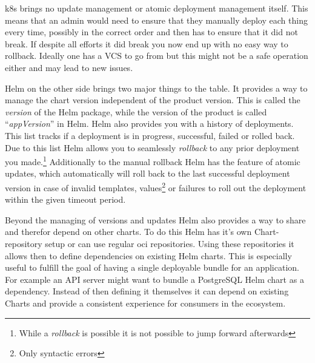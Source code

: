 \Gls{k8s} brings no update management or atomic deployment management itself.
This means that an admin would need to ensure that they manually deploy each thing every time, possibly in the correct order and then has to ensure that it did not break.
If despite all efforts it did break you now end up with no easy way to rollback.
Ideally one has a VCS to go from but this might not be a safe operation either and may lead to new issues.

Helm on the other side brings two major things to the table.
It provides a way to manage the chart version independent of the product version.
This is called the \emph{version} of the Helm package, while the version of the product is called \enquote{\emph{appVersion}} in Helm.
Helm also provides you with a history of deployments.
This list tracks if a deployment is in progress, successful, failed or rolled back.
Due to this list Helm allows you to seamlessly \emph{rollback} to any prior deployment you made.\footnote{While a \emph{rollback} is possible it is not possible to jump forward afterwards}
Additionally to the manual rollback Helm has the feature of atomic updates, which automatically will roll back to the last successful deployment version in case of invalid templates, values\footnote{Only syntactic errors} or failures to roll out the deployment within the given timeout period.

Beyond the managing of versions and updates Helm also provides a way to share and therefor depend on other charts.
To do this Helm has it's own Chart-repository setup or can use regular \gls{oci} repositories.
Using these repositories it allows then to define dependencies on existing Helm charts.
This is especially useful to fulfill the goal of having a single deployable bundle for an application.
For example an API server might want to bundle a PostgreSQL Helm chart as a dependency.
Instead of then defining it themselves it can depend on existing Charts and provide a consistent experience for consumers in the ecosystem.